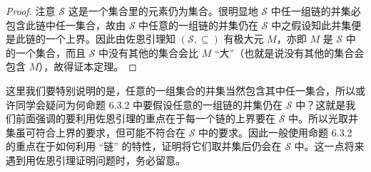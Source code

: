 \begin{proof}
注意 $\mathcal{S}$ 这是一个集合里的元素仍为集合。很明显地 $\mathcal{S}$ 中任一组链的并集必包含此链中任一集合，故由 $\mathcal{S}$ 中任意的一组链的并集仍在 $\mathcal{S}$ 中之假设知此并集便是此链的一个上界。因此由佐恩引理知 $(\mathcal{S}, \subseteq)$ 有极大元 $M$，亦即 $M$ 是 $\mathcal{S}$ 中的一个集合，而且 $\mathcal{S}$ 中没有其他的集合会比 $M$ “大”（也就是说没有其他的集合会包含 $M$），故得证本定理。
\end{proof}

这里我们要特别说明的是，任意的一组集合的并集当然包含其中任一集合，所以或许同学会疑问为何命题 6.3.2 中要假设任意的一组链的并集仍在 $\mathcal{S}$ 中？这就是我们前面强调的要利用佐恩引理的重点在于每一个链的上界要在 $\mathcal{S}$ 中。所以光取并集虽可符合上界的要求，但可能不符合在 $\mathcal{S}$ 中的要求。因此一般使用命题 6.3.2 的重点在于如何利用 “链” 的特性，证明将它们取并集后仍会在 $\mathcal{S}$ 中。这一点将来遇到用佐恩引理证明问题时，务必留意。

